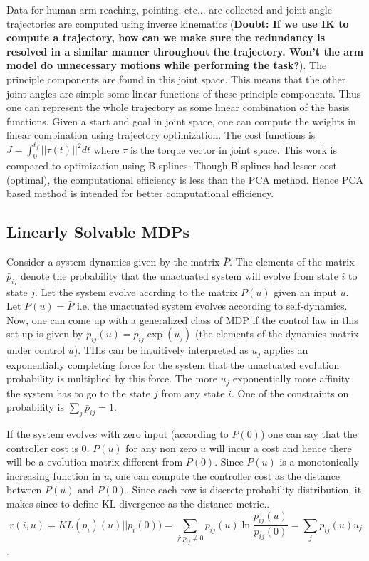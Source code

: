 \documentclass{article}[11pt]
\begin{document}
Data for human arm reaching, pointing, etc... are collected and joint angle trajectories are computed using inverse kinematics (\textbf{Doubt: If we use IK to compute a trajectory, how can we make sure the redundancy is resolved in a similar manner throughout the trajectory. Won't the arm model do unnecessary motions while performing the task?}). The principle components are found in this joint space. This means that the other joint angles are simple some linear functions of these principle components. Thus one can represent the whole trajectory as some linear combination of the basis functions. Given a start and goal in joint space, one can compute the weights in linear combination using trajectory optimization. The cost functions is $J = \int_0^{t_f}||\tau(t)||^2 dt$ where $\tau$ is the torque vector in joint space. This work is compared to optimization using B-splines. Though B splines had lesser cost (optimal), the computational efficiency is less than the PCA method. Hence PCA based method is intended for better computational efficiency. 

\subsection{Linearly Solvable MDPs \cite{todorov2006linearly}}
Consider a system dynamics given by the matrix $\bar{P}$. The elements of the matrix $\bar{p}_{ij}$ denote the probability that the unactuated system will evolve from state $i$ to state $j$. Let the system evolve accrding to the matrix $P(u)$ given an input $u$. Let $P(u) = \bar{P}$ i.e. the unactuated system evolves according to self-dynamics. Now, one can come up with a generalized class of MDP if the control law in this set up is given by $p_{ij}(u) = \bar{p}_{ij}\exp(u_j)$ (the elements of the dynamics matrix under control $u$). THis can be intuitively interpreted as $u_j$ applies an exponentially completing force for the system that the unactuated evolution probability is multiplied by this force. The more $u_j$ exponentially more affinity the system has to go to the state $j$ from any state $i$. One of the constraints on probability is $\sum_j\bar{p}_{ij} = 1$. 

If the system evolves with zero input (according to $P(0)$) one can say that the controller cost is $0$. $P(u)$ for any non zero $u$ will incur a cost and hence there will be a evolution matrix different from $P(0)$. Since $P(u)$ is a monotonically increasing function in $u$, one can compute the controller cost as the distance between $P(u)$ and $P(0)$. Since each row is discrete probability distribution, it makes since to define KL divergence as the distance metric.. $$r(i,u) = KL(p_i)(u) || p_i(0)) = \sum_{j : p_{ij} \ne 0}p_{ij}(u) \ln{\frac{p_{ij}(u)}{p_{ij}(0)}} = \sum_jp_{ij}(u)u_j$$. 
\end{document}
